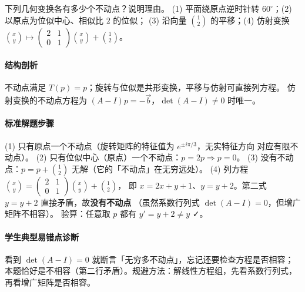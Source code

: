 \begin{problem}
下列几何变换各有多少个不动点？说明理由。
(1) 平面绕原点逆时针转 $60^\circ$；(2) 以原点为位似中心、相似比 $2$ 的位似；
(3) 沿向量 $\binom12$ 的平移；(4) 仿射变换 $\binom xy\mapsto
\begin{pmatrix}2&1\\0&1\end{pmatrix}\binom xy+\binom12$。
\end{problem}
\begin{solution}
\paragraph{结构剖析}
不动点满足 $T(p)=p$；旋转与位似是共形变换，平移与仿射可直接列方程。
仿射变换的不动点方程为 $(A-I)p=-\vec b$，$\det(A-I)\neq0$ 时唯一。
\paragraph{标准解题步骤}
(1) 只有原点一个不动点（旋转矩阵的特征值为 $e^{\pm i\pi/3}$，无实特征方向
对应有限不动点）。
(2) 只有位似中心（原点）一个不动点：$p=2p\Rightarrow p=0$。
(3) 没有不动点：$p=p+\binom12$ 无解（它的「不动点」在无穷远处）。
(4) 列方程 $\binom xy=\begin{pmatrix}2&1\\0&1\end{pmatrix}\binom xy+\binom12$，
即 $x=2x+y+1$、$y=y+2$。第二式 $y=y+2$ 直接矛盾，故\textbf{没有不动点}
（虽然系数行列式 $\det(A-I)=0$，但增广矩阵不相容）。
验算：任意取 $p$ 都有 $y'=y+2\neq y$ ✓。
\paragraph{学生典型易错点诊断}
看到 $\det(A-I)=0$ 就断言「无穷多不动点」，忘记还要检查方程是否相容；
本题恰好是不相容（第二行矛盾）。规避方法：解线性方程组，先看系数行列式，
再看增广矩阵是否相容。
\end{solution}

